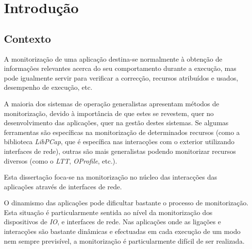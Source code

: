 \chapter{Introdução}\label{cap:introducao}

\section{Contexto}
\label{sec:intro_context}
A monitorização de uma aplicação destina-se normalmente à obtenção de informações relevantes acerca do seu comportamento durante a execução, mas pode igualmente servir para verificar a correcção, recursos atribuídos e usados, desempenho de execução, etc.

A maioria dos sistemas de operação generalistas apresentam métodos de monitorização, devido à importância de que estes se revestem, quer no desenvolvimento das aplicações, quer na gestão destes sistemas.
Se algumas ferramentas são específicas na monitorização de determinados recursos (como a biblioteca \textit{LibPCap}, que é específica nas interacções com o exterior utilizando interfaces de rede), outras são mais generalistas podendo monitorizar recursos diversos (como o \textit{LTT}, \textit{OProfile}, etc.).

Esta dissertação foca-se na monitorização no núcleo das interacções das aplicações através de interfaces de rede.

O dinamismo das aplicações pode dificultar bastante o processo de monitorização.
Esta situação é particularmente sentida ao nível da monitorização dos dispositivos de \textit{IO}, e interfaces de rede.
Nas aplicações onde as ligações e interacções são bastante dinâmicas e efectuadas em cada execução de um modo nem sempre previsível, a monitorização é particularmente difícil de ser realizada.

